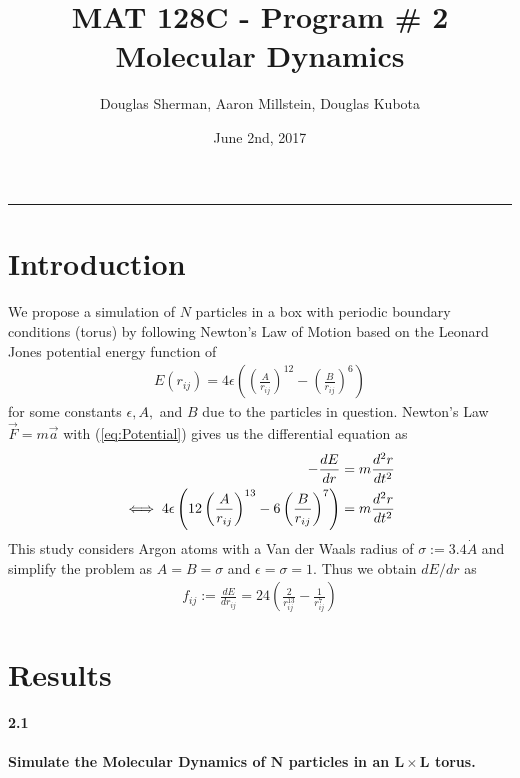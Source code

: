 \documentclass[11.5pt]{article}
\newcommand{\Frac}[2]{\left(\frac{#1}{#2}\right)}
\newcommand{\mbf}[1]{\mathbf{#1}}
\begin{document}
\title{MAT 128C - Program \# 2 Molecular Dynamics}
\author{Douglas Sherman, Aaron Millstein, Douglas Kubota}
\date{June 2nd, 2017}
\maketitle
\rule{\textwidth}{1pt}
\lstset{style=small} %

\section{Introduction}
\paragraph{}
We propose a simulation of $N$ particles in a box with periodic boundary conditions (torus) by following Newton's Law of Motion based on the Leonard Jones potential energy function of
\begin{align} \label{eq:Potential}
E(r_{ij}) = 4\epsilon \left( \Frac{A}{r_{ij}}^12 - \Frac{B}{r_{ij}}^6\right) 
\end{align}
for some constants $\epsilon,A,$ and $B$ due to the particles in question. Newton's Law $\vec{F}=m\vec{a}$ with (\ref{eq:Potential}) gives us the differential equation as
\begin{align} \label{eg:FMA}
-\frac{dE}{dr}&=m\frac{d^2r}{dt^2}\notag \\ 
\iff 4\epsilon\left( 12\Frac{A}{r_{ij}}^{13} - 6\Frac{B}{r_{ij}}^7\right) &= m \frac{d^2r}{dt^2}
\end{align}
This study considers Argon atoms with a Van der Waals radius of $\sigma := 3.4 \dot{A}$ and simplify the problem as $A= B = \sigma$ and $\epsilon = \sigma = 1$. Thus we obtain $dE/dr$ as 
\begin{align*}
f_{ij}:= \frac{dE}{dr_{ij}} = 24\left(\frac{2}{r_{ij}^{13}} - \frac{1}{r_{ij}^7}\right)
\end{align*}

\section{Results}
\paragraph{2.1}\textbf{Simulate the Molecular Dynamics of $\mbf{N}$ particles in an $\mbf{L\times L}$ torus.}\\
\end{document}
